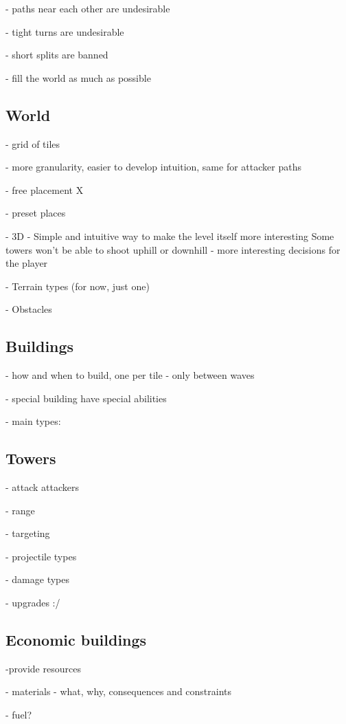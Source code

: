 - paths near each other are undesirable

- tight turns are undesirable

- short splits are banned

- fill the world as much as possible

\subsection{World}

- grid of tiles \checkmark

- more granularity, easier to develop intuition, same for attacker paths

- free placement X

- preset places

- 3D \checkmark
- Simple and intuitive way to make the level itself more interesting
Some towers won't be able to shoot uphill or downhill - more interesting decisions for the player

- Terrain types (for now, just one)

- Obstacles

\subsection{Buildings}

- how and when to build, one per tile
- only between waves

- special building have special abilities

- main types:


\subsection{Towers}

- attack attackers

- range

- targeting

- projectile types

- damage types

- upgrades :/

\subsection{Economic buildings}

-provide resources

- materials - what, why, consequences and constraints

- fuel?

